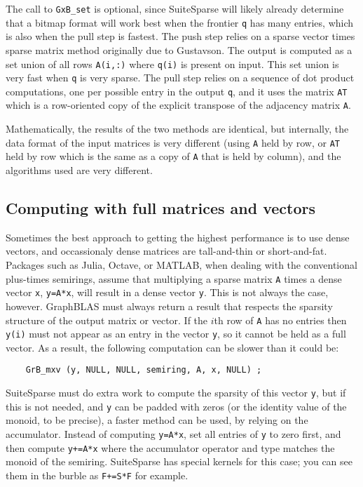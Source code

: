 \documentclass[12pt]{article}
\begin{document}
{The call to \verb'GxB_set' is optional, since SuiteSparse will likely already
determine that a bitmap format will work best when the frontier \verb'q' has
many entries, which is also when the pull step is fastest.  The push step
relies on a sparse vector times sparse matrix method originally due to
Gustavson.  The output is computed as a set union of all rows \verb'A(i,:)'
where \verb'q(i)' is present on input.  This set union is very fast when
\verb'q' is very sparse.  The pull step relies on a sequence of dot product
computations, one per possible entry in the output \verb'q', and it uses the
matrix \verb"AT" which is a row-oriented copy of the explicit transpose of the
adjacency matrix \verb'A'.

Mathematically, the results of the two methods are identical, but internally,
the data format of the input matrices is very different (using \verb'A' held
by row, or \verb'AT' held by row which is the same as a copy of \verb'A' that
is held by column), and the algorithms used are very different.

\subsection{Computing with full matrices and vectors}

Sometimes the best approach to getting the highest performance is to use dense
vectors, and occassionaly dense matrices are tall-and-thin or short-and-fat.
Packages such as Julia, Octave, or MATLAB, when dealing with the conventional
plus-times semirings, assume that multiplying a sparse matrix \verb'A' times a
dense vector \verb'x', \verb'y=A*x', will result in a dense vector \verb'y'.
This is not always the case, however. GraphBLAS must always return a result
that respects the sparsity structure of the output matrix or vector.  If the
$i$th row of \verb'A' has no entries then \verb'y(i)' must not appear as an
entry in the vector \verb'y', so it cannot be held as a full vector.  As a
result, the following computation can be slower than it could be:

    {\scriptsize
    \begin{verbatim}
    GrB_mxv (y, NULL, NULL, semiring, A, x, NULL) ; \end{verbatim}}

SuiteSparse must do extra work to compute the sparsity of this vector \verb'y',
but if this is not needed, and \verb'y' can be padded with zeros (or 
the identity value of the monoid, to be precise), a faster method can be used,
by relying on the accumulator.  Instead of computing \verb'y=A*x', set all
entries of \verb'y' to zero first, and then compute \verb'y+=A*x' where the
accumulator operator and type matches the monoid of the semiring.  SuiteSparse
has special kernels for this case; you can see them in the burble as
\verb'F+=S*F' for example.

}
\end{document}
